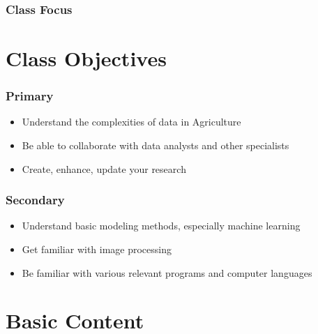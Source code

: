\documentclass{beamer}
\def\firstcircle{(0,0) circle (1.5cm)}
\def\secondcircle{(60:2cm) circle (1.5cm)}
\def\thirdcircle{(0:2cm) circle (1.5cm)}
\begin{document}

\begin{frame}
\frametitle{Class Focus}
\begin{center}
    \end{center}
\end{frame}

\section{Class Objectives}
\begin{frame}
\frametitle{Primary}
\begin{itemize}
\item<2-> Understand the complexities of data in Agriculture
\item<3-> Be able to collaborate with data analysts and other specialists
\item<4-> Create, enhance, update your research 

\end{itemize}

\end{frame}
\begin{frame}
\frametitle{Secondary}
\begin{itemize}
\item<2-> Understand basic modeling methods, especially machine learning
\item<3-> Get familiar with image processing
\item<4-> Be familiar with various relevant programs and computer languages
\end{itemize}

\end{frame}


\section{Basic Content}
%
\end{document}
